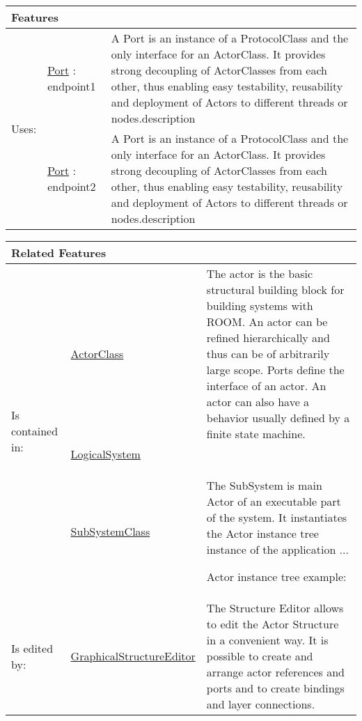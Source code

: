 			
			\vspace{\baselineskip}
			\begingroup
			\renewcommand{\arraystretch}{1.8} %
			\parbox{\textwidth}{
			\begin{longtable}{l l p{}}
				\multicolumn{2}{l}{\textbf{\large Features}} & \\
				\hline
			\multirow{2}{*}{Uses:} & \tabitem \hyperlink{ref:Port}{Port} : endpoint1 & A Port is an instance of a ProtocolClass and the only interface for an ActorClass. It provides strong decoupling of ActorClasses from each other, thus enabling easy testability, reusability and deployment of Actors to different threads or nodes.description \\
			& \tabitem \hyperlink{ref:Port}{Port} : endpoint2 & A Port is an instance of a ProtocolClass and the only interface for an ActorClass. It provides strong decoupling of ActorClasses from each other, thus enabling easy testability, reusability and deployment of Actors to different threads or nodes.description  \\
			\hline
			\end{longtable}	
			}
			\endgroup
			\vspace{\baselineskip}
			
			\vspace{\baselineskip}
			\begingroup
			\renewcommand{\arraystretch}{1.8} %
			\parbox{\textwidth}{
			\begin{longtable}{l l p{}}
				\multicolumn{2}{l}{\textbf{\large Related Features}} & \\
				\hline
			\multirow{3}{*}{Is contained in:} & \tabitem \hyperlink{ref:ActorClass}{ActorClass}  & The actor is the basic structural building block for building systems with ROOM. An actor can be refined hierarchically and thus can be of arbitrarily large scope. Ports define the interface of an actor. An actor can also have a behavior usually defined by a finite state machine. \\
			& \tabitem \hyperlink{ref:LogicalSystem}{LogicalSystem}  &  \\
			& \tabitem \hyperlink{ref:SubSystemClass}{SubSystemClass}  & The SubSystem is main Actor of an executable part of the system. It instantiates the Actor instance tree instance of the application ...
				
				Actor instance tree example:
				 \\
			\hline
			Is edited by: & \tabitem \hyperlink{ref:GraphicalStructureEditor}{GraphicalStructureEditor}  & The Structure Editor allows to edit the Actor Structure in a convenient way. It is possible to create and arrange actor references and ports and to create bindings and layer connections.\\
			\hline
			\end{longtable}	
			}
			\endgroup
			\vspace{\baselineskip}
			
